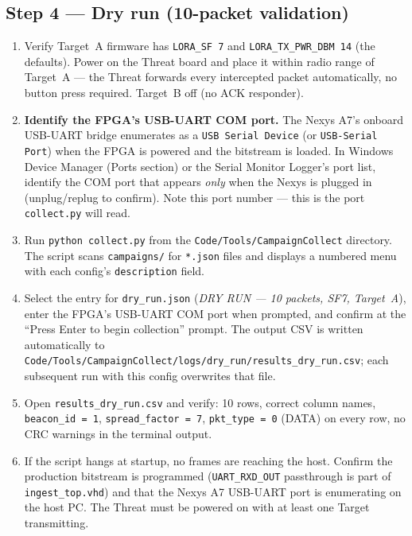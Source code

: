 \documentclass[11pt,letterpaper]{article}
\begin{document}
\subsection{Step 4 --- Dry run (10-packet validation)}
\begin{enumerate}[leftmargin=2em]
	\item Verify Target~A firmware has \texttt{LORA\_SF~7} and \texttt{LORA\_TX\_PWR\_DBM~14} (the defaults). Power on the Threat board and place it within radio range of Target~A --- the Threat forwards every intercepted packet automatically, no button press required. Target~B off (no ACK responder).
	\item \textbf{Identify the FPGA's USB-UART COM port.} The Nexys A7's onboard USB-UART bridge enumerates as a \texttt{USB Serial Device} (or \texttt{USB-Serial Port}) when the FPGA is powered and the bitstream is loaded. In Windows Device Manager (Ports section) or the Serial Monitor Logger's port list, identify the COM port that appears \emph{only} when the Nexys is plugged in (unplug/replug to confirm). Note this port number --- this is the port \texttt{collect.py} will read.
	\item Run \texttt{python collect.py} from the \texttt{Code/Tools/CampaignCollect} directory. The script scans \texttt{campaigns/} for \texttt{*.json} files and displays a numbered menu with each config's \texttt{description} field.
	\item Select the entry for \texttt{dry\_run.json} (\emph{DRY RUN --- 10 packets, SF7, Target~A}), enter the FPGA's USB-UART COM port when prompted, and confirm at the ``Press Enter to begin collection'' prompt. The output CSV is written automatically to \\ \texttt{Code/Tools/CampaignCollect/logs/dry\_run/results\_dry\_run.csv}; each subsequent run with this config overwrites that file.
	\item Open \texttt{results\_dry\_run.csv} and verify: 10 rows, correct column names, \texttt{beacon\_id = 1}, \texttt{spread\_factor = 7}, \texttt{pkt\_type = 0} (DATA) on every row, no \mbox{CRC} warnings in the terminal output.
	\item If the script hangs at startup, no frames are reaching the host. Confirm the production bitstream is programmed (\texttt{UART\_RXD\_OUT} passthrough is part of \texttt{ingest\_top.vhd}) and that the Nexys A7 \mbox{USB-UART} port is enumerating on the host PC. The Threat must be powered on with at least one Target transmitting.
\end{enumerate}
\end{document}
